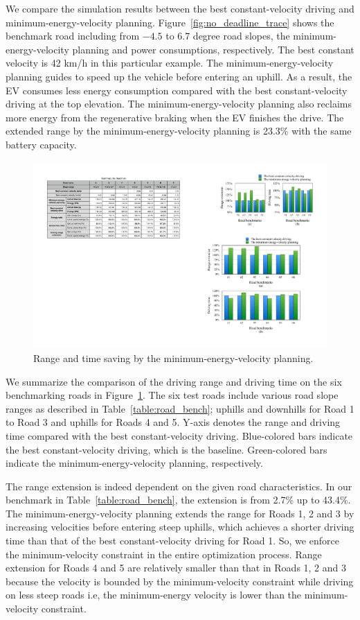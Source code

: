 \documentclass{IEEEtran}
\begin{document}
We compare the simulation results between the best constant-velocity driving and minimum-energy-velocity planning. Figure~\ref{fig:no_deadline_trace} shows the benchmark road including from $-4.5$ to 6.7 degree road slopes, the minimum-energy-velocity planning and power consumptions, respectively. The best constant velocity is 42 km/h in this particular example. The minimum-energy-velocity planning guides to speed up the vehicle before entering an uphill. As a result, the EV consumes less energy consumption compared with the best constant-velocity driving at the top elevation. The minimum-energy-velocity planning also reclaims more energy from the regenerative braking when the EV finishes the drive. The extended range by the minimum-energy-velocity planning is 23.3\% with the same battery capacity.

\begin{figure}	 %
\includegraphics[width=1.0\hsize]{Figures/no_deadline_bar.pdf}
\caption{Range and time saving by the minimum-energy-velocity planning.}
\label{fig:no_deadline_bar}
\end{figure} 

We summarize the comparison of the driving range and driving time on the six benchmarking roads in Figure~\ref{fig:no_deadline_bar}. The six test roads include various road slope ranges as described in Table~\ref{table:road_bench}; uphills and downhills for Road 1 to Road 3 and uphills for Roads 4 and 5. Y-axis denotes the range and driving time compared with the best constant-velocity driving. Blue-colored bars indicate the best constant-velocity driving, which is the baseline. Green-colored bars indicate the minimum-energy-velocity planning, respectively.

The range extension is indeed dependent on the given road characteristics. In our benchmark in Table~\ref{table:road_bench}, the extension is from 2.7\% up to 43.4\%. The minimum-energy-velocity planning extends the range for Roads 1, 2 and  3 by increasing velocities before entering steep uphills, which achieves a shorter driving time than that of the best constant-velocity driving for Road 1. So, we enforce the minimum-velocity constraint in the entire optimization process. Range extension for Roads 4 and 5 are relatively smaller than that in Roads 1, 2 and 3 because the velocity is bounded by the minimum-velocity constraint while driving on less steep roads i.e, the minimum-energy velocity is lower than the minimum-velocity constraint.
\end{document}
